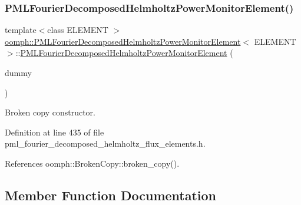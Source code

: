 \subsubsection{\texorpdfstring{P\+M\+L\+Fourier\+Decomposed\+Helmholtz\+Power\+Monitor\+Element()}{PMLFourierDecomposedHelmholtzPowerMonitorElement()}\hspace{0.1cm}{\footnotesize\ttfamily [3/3]}}
{\footnotesize\ttfamily template$<$class E\+L\+E\+M\+E\+NT $>$ \\
\hyperlink{classoomph_1_1PMLFourierDecomposedHelmholtzPowerMonitorElement}{oomph\+::\+P\+M\+L\+Fourier\+Decomposed\+Helmholtz\+Power\+Monitor\+Element}$<$ E\+L\+E\+M\+E\+NT $>$\+::\hyperlink{classoomph_1_1PMLFourierDecomposedHelmholtzPowerMonitorElement}{P\+M\+L\+Fourier\+Decomposed\+Helmholtz\+Power\+Monitor\+Element} (\begin{DoxyParamCaption}\item[{const \hyperlink{classoomph_1_1PMLFourierDecomposedHelmholtzPowerMonitorElement}{P\+M\+L\+Fourier\+Decomposed\+Helmholtz\+Power\+Monitor\+Element}$<$ E\+L\+E\+M\+E\+NT $>$ \&}]{dummy }\end{DoxyParamCaption})\hspace{0.3cm}{\ttfamily [inline]}}



Broken copy constructor. 



Definition at line 435 of file pml\+\_\+fourier\+\_\+decomposed\+\_\+helmholtz\+\_\+flux\+\_\+elements.\+h.



References oomph\+::\+Broken\+Copy\+::broken\+\_\+copy().



\subsection{Member Function Documentation}
\mbox{\label{classoomph_1_1PMLFourierDecomposedHelmholtzPowerMonitorElement_a43f7cea01ac130a95597e9829ebb4ccc}} 
